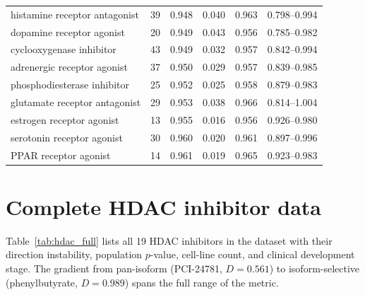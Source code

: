 \documentclass[11pt]{article}
\begin{document}
\begin{table}[h]
\begin{tabular}{lrrrrr}
histamine receptor antagonist & 39 & 0.948 & 0.040 & 0.963 & 0.798--0.994 \\
dopamine receptor agonist & 20 & 0.949 & 0.043 & 0.956 & 0.785--0.982 \\
cyclooxygenase inhibitor & 43 & 0.949 & 0.032 & 0.957 & 0.842--0.994 \\
adrenergic receptor agonist & 37 & 0.950 & 0.029 & 0.957 & 0.839--0.985 \\
phosphodiesterase inhibitor & 25 & 0.952 & 0.025 & 0.958 & 0.879--0.983 \\
glutamate receptor antagonist & 29 & 0.953 & 0.038 & 0.966 & 0.814--1.004 \\
estrogen receptor agonist & 13 & 0.955 & 0.016 & 0.956 & 0.926--0.980 \\
serotonin receptor agonist & 30 & 0.960 & 0.020 & 0.961 & 0.897--0.996 \\
PPAR receptor agonist & 14 & 0.961 & 0.019 & 0.965 & 0.923--0.983 \\
\bottomrule
\end{tabular}
\end{table}

\section{Complete HDAC inhibitor data}
\label{app:hdac}

Table~\ref{tab:hdac_full} lists all 19 HDAC inhibitors in the dataset with
their direction instability, population $p$-value, cell-line count, and
clinical development stage. The gradient from pan-isoform (PCI-24781,
$D = 0.561$) to isoform-selective (phenylbutyrate, $D = 0.989$) spans the
full range of the metric.
\end{document}
